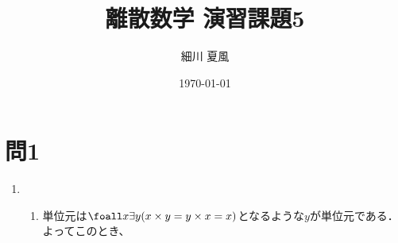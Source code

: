 \documentclass[dvipdfmx]{jlreq}
\title{離散数学 演習課題5}
\author{細川 夏風}
\date{\today}
\begin{document}
\maketitle

\section{問1}
\renewcommand{\theenumi}{(\arabic{enumi})}
\begin{enumerate}
\vspace{12pt}
    \item
        \begin{enumerate}
            \item 単位元は$\foall x \exists y (x \times y = y \times x = x )$となるような$y$が単位元である．よってこのとき、
                
            
        \end{enumerate}

\end{enumerate}
\end{document}
